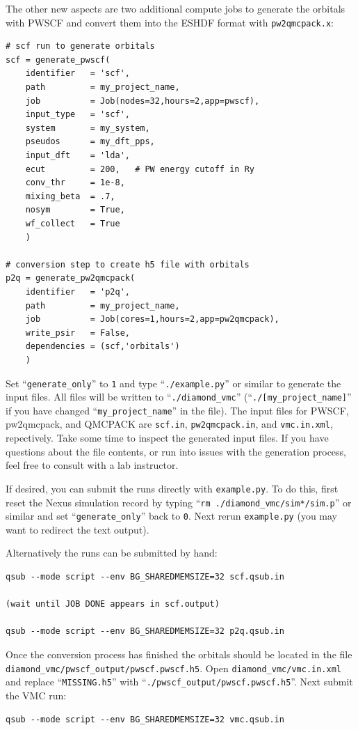 The other new aspects are two additional compute jobs to generate the orbitals with PWSCF and convert them into the ESHDF format with \texttt{pw2qmcpack.x}:

\begin{shaded}
\begin{verbatim}
# scf run to generate orbitals
scf = generate_pwscf(
    identifier   = 'scf',
    path         = my_project_name,
    job          = Job(nodes=32,hours=2,app=pwscf),
    input_type   = 'scf',
    system       = my_system,
    pseudos      = my_dft_pps,
    input_dft    = 'lda', 
    ecut         = 200,   # PW energy cutoff in Ry
    conv_thr     = 1e-8, 
    mixing_beta  = .7,
    nosym        = True,
    wf_collect   = True
    )

# conversion step to create h5 file with orbitals
p2q = generate_pw2qmcpack(
    identifier   = 'p2q',
    path         = my_project_name,
    job          = Job(cores=1,hours=2,app=pw2qmcpack),
    write_psir   = False,
    dependencies = (scf,'orbitals')
    )
\end{verbatim}
\end{shaded}

Set ``\texttt{generate\_only}'' to \texttt{1} and type ``\texttt{./example.py}'' or similar to generate the input files.  All files will be written to ``\texttt{./diamond\_vmc}'' (``\texttt{./[my\_project\_name]}'' if you have changed ``\texttt{my\_project\_name}'' in the file).  The input files for PWSCF, pw2qmcpack, and QMCPACK are \texttt{scf.in}, \texttt{pw2qmcpack.in}, and \texttt{vmc.in.xml}, repectively.  Take some time to inspect the generated input files.  If you have questions about the file contents, or run into issues with the generation process, feel free to consult with a lab instructor.  

If desired, you can submit the runs directly with \texttt{example.py}.  To do this, first reset the Nexus simulation record by typing ``\texttt{rm ./diamond\_vmc/sim*/sim.p}'' or similar and set ``\texttt{generate\_only}'' back to \texttt{0}.  Next rerun \texttt{example.py}  (you may want to redirect the text output).  

Alternatively the runs can be submitted by hand:
\begin{shaded}
\begin{verbatim}
qsub --mode script --env BG_SHAREDMEMSIZE=32 scf.qsub.in

(wait until JOB DONE appears in scf.output)

qsub --mode script --env BG_SHAREDMEMSIZE=32 p2q.qsub.in
\end{verbatim}
\end{shaded}
Once the conversion process has finished the orbitals should be located in the file \texttt{diamond\_vmc/pwscf\_output/pwscf.pwscf.h5}.  Open \texttt{diamond\_vmc/vmc.in.xml} and replace ``\texttt{MISSING.h5}'' with ``\texttt{./pwscf\_output/pwscf.pwscf.h5}''.  Next submit the VMC run:
\begin{shaded}
\begin{verbatim}
qsub --mode script --env BG_SHAREDMEMSIZE=32 vmc.qsub.in
\end{verbatim}
\end{shaded}

